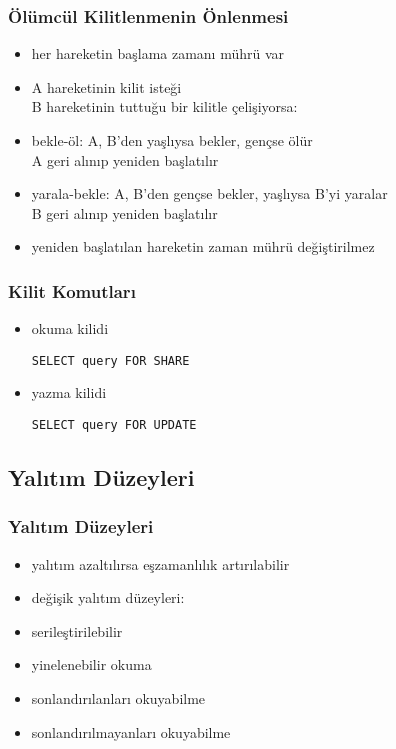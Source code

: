 \documentclass[dvipsnames]{beamer}
\theoremstyle{plain}
\begin{document}
\begin{frame}
  \frametitle{Ölümcül Kilitlenmenin Önlenmesi}

  \begin{itemize}
    \item her hareketin başlama zamanı mührü var

    \pause
    \item A hareketinin kilit isteği\\
      B hareketinin tuttuğu bir kilitle çelişiyorsa:
      
    \medskip  
      \item \alert{bekle-öl}: A, B'den yaşlıysa bekler, gençse ölür\\
        A geri alınıp yeniden başlatılır

      \item \alert{yarala-bekle}: A, B'den gençse bekler, yaşlıysa B'yi
        yaralar\\
        B geri alınıp yeniden başlatılır

      \pause
      \medskip
      \item yeniden başlatılan hareketin zaman mührü değiştirilmez
  \end{itemize}
\end{frame}

\begin{frame}[fragile]
  \frametitle{Kilit Komutları}

  \begin{itemize}
    \item okuma kilidi
    \begin{lstlisting}
SELECT query FOR SHARE
    \end{lstlisting}

    \item yazma kilidi
    \begin{lstlisting}
SELECT query FOR UPDATE
    \end{lstlisting}
  \end{itemize}
\end{frame}

\subsection{Yalıtım Düzeyleri}

\begin{frame}
  \frametitle{Yalıtım Düzeyleri}

  \begin{itemize}
    \item yalıtım azaltılırsa eşzamanlılık artırılabilir
    \item değişik yalıtım düzeyleri:

    \bigskip
    \item serileştirilebilir
    \item yinelenebilir okuma
    \item sonlandırılanları okuyabilme
    \item sonlandırılmayanları okuyabilme
  \end{itemize}
\end{frame}
\end{document}
